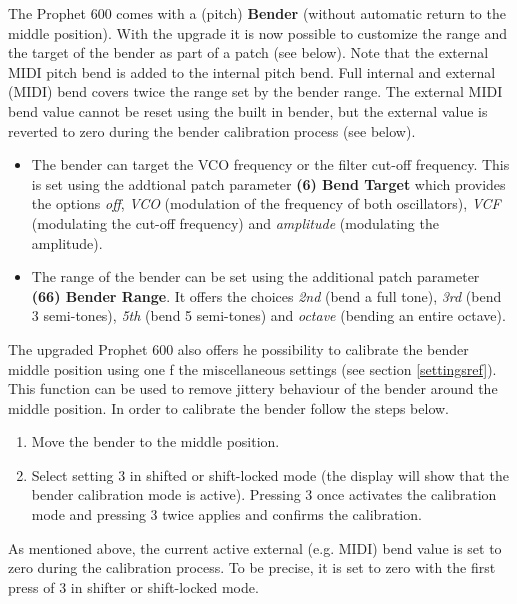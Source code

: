 The Prophet 600 comes with a (pitch) \textbf{Bender} (without automatic return to the middle position). With the upgrade it is now possible to customize the range and the target of the bender as part of a patch (see below). Note that the external MIDI pitch bend is added to the internal pitch bend. Full internal and external (MIDI) bend covers twice the range set by the bender range. The external MIDI bend value cannot be reset using the built in bender, but the external value is reverted to zero during the bender calibration process (see below).


\begin{itemize}
  \item The bender can target the VCO frequency or the filter cut-off frequency. This is set using the addtional patch parameter \textbf{(6) Bend Target} which provides the options \textit{off}, \textit{VCO} (modulation of the frequency of both oscillators), \textit{VCF} (modulating the cut-off frequency) and \textit{amplitude} (modulating the amplitude).
  \item The range of the bender can be set using the additional patch parameter \textbf{(66) Bender Range}. It offers the choices \textit{2nd} (bend a full tone), \textit{3rd} (bend 3 semi-tones), \textit{5th} (bend 5 semi-tones) and \textit{octave} (bending an entire octave).
\end{itemize}

The upgraded Prophet 600 also offers he possibility to calibrate the bender middle position using one f the miscellaneous settings (see section \ref{settingsref}). This function can be used to remove jittery behaviour of the bender around the middle position. In order to calibrate the bender follow the steps below.

\begin{enumerate}
  \item Move the bender to the middle position.  
  \item Select setting 3 in shifted or shift-locked mode (the display will show that the bender calibration mode is active). Pressing 3 once activates the calibration mode and pressing 3 twice applies and confirms the calibration. 
\end{enumerate}

As mentioned above, the current active external (e.g. MIDI) bend value is set to zero during the calibration process. To be precise, it is set to zero with the first press of 3 in shifter or shift-locked mode.
